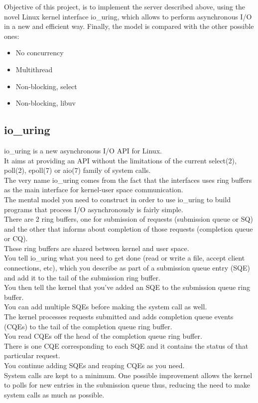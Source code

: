 \documentclass[10pt, oneside,english]{article}   	%
\begin{document}
Objective of this project, is to implement the server described above, using the novel Linux kernel interface io\_uring, which allows to perform asynchronous I/O in a new and efficient way.
Finally, the model is compared with the other possible ones: 

\begin{itemize}
    \item No concurrency
    \item Multithread
    \item Non-blocking, select
    \item Non-blocking, libuv
\end{itemize}


\subsection{io\_uring}
io\_uring is a new asynchronous I/O API for Linux.\\
It aims at providing an API without the limitations of the current select(2), poll(2), epoll(7) or aio(7) family of system calls. \\
The very name io\_uring comes from the fact that the interfaces uses ring buffers as the main interface for kernel-user space communication. \\
The mental model you need to construct in order to use io\_uring to build programs that process I/O asynchronously is fairly simple.\\
There are 2 ring buffers, one for submission of requests (submission queue or SQ) and the other that informs about completion of those requests (completion queue or CQ).\\
These ring buffers are shared between kernel and user space.\\
You tell io\_uring what you need to get done (read or write a file, accept client connections, etc), which you describe as part of a submission queue entry (SQE) and add it to the tail of the submission ring buffer.\\
You then tell the kernel that you’ve added an SQE to the submission queue ring buffer. \\
You can add multiple SQEs before making the system call as well.\\
The kernel processes requests submitted and adds completion queue events (CQEs) to the tail of the completion queue ring buffer.\\
You read CQEs off the head of the completion queue ring buffer. \\
There is one CQE corresponding to each SQE and it contains the status of that particular request.\\
You continue adding SQEs and reaping CQEs as you need.\\
System calls are kept to a minimum.
One possible improvement allows the kernel to polls for new entries in the submission queue thus, reducing the need to make system calls as much as possible. \\
\end{document}
